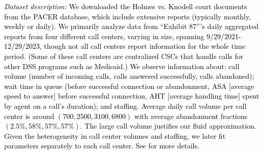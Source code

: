 \documentclass[manuscript,screen,authorversion]{acmart}
\newcommand{\rev}[1]{\textcolor{black}{#1}}
\begin{document}
\rev{\textit{Dataset description: }
We downloaded the Holmes vs. Knodell court documents from the PACER database, which include extensive reports (typically monthly, weekly or daily). %
We primarily analyze data from ``Exhibit 87'''s daily aggregated reports from four different call centers, varying in size, spanning 9/29/2021-12/29/2023, though not all call centers report information for the whole time period. (Some of these call centers are centralized CSCs that handle calls for other DSS programs such as Medicaid.) %
We observe information about: call volume (number of incoming calls, calls answered successfully, calls abandoned); wait time in queue (before successful connection or abandonment, ASA [average speed to answer] before successful connection, AHT [average handling time] spent by agent on a call's duration); and staffing.
Average daily call volume per call center is around $(700, 2500, 3100, 6800)$ with average abandonment fractions $(2.5\%, 58\%, 57\%, 57\%)$. The large call volume justifies our fluid approximation. Given the heterogeneity in call center volumes and staffing, we later fit parameters separately to each call center. See \Cref{apx-callcenterdata} for more details.}
\end{document}
